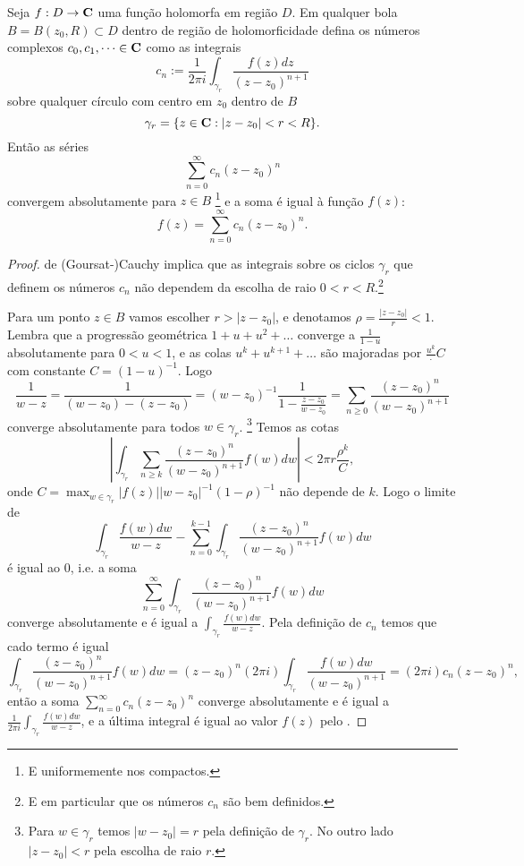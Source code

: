 \begin{teorema}
\label{t:hol-series}
Seja $f : D \to \mathbf{C}$ uma função holomorfa em região $D$.
Em qualquer bola $B = B(z_0,R) \subset D$ dentro de região de holomorficidade
defina os números complexos $c_0,c_1,\dots\in\mathbf{C}$ como as integrais
\begin{equation}
 c_n := \frac1{2\pi i} \int_{\gamma_r} \frac{f(z)dz}{(z-z_0)^{n+1}} 
\end{equation}
sobre qualquer círculo com centro em $z_0$ dentro de $B$  
\[ \gamma_r = \{ z\in \mathbf{C} : |z-z_0|< r < R \}. \]
Então as séries
\[ \sum_{n=0}^\infty c_n (z-z_0)^n \]
convergem absolutamente para $z\in B$
\footnote{E uniformemente nos compactos.}
e a soma é igual à função $f(z)$:
\[ f(z) = \sum_{n=0}^\infty c_n (z-z_0)^n. \]
\end{teorema}
\begin{proof}
 de (Goursat-)Cauchy implica que as integrais sobre os ciclos $\gamma_r$
que definem os números $c_n$
não dependem da escolha de raio $0<r<R$.\footnote{E em particular que os números $c_n$ são bem definidos.}

Para um ponto $z\in B$ vamos escolher $r > |z-z_0|$, e denotamos $\rho = \frac{|z-z_0|}{r} < 1$.
Lembra que a progressão geométrica $1 + u + u^2 + \dots$ converge a $\frac{1}{1-u}$ absolutamente para $0<u<1$,
e as colas $u^k + u^{k+1} + \dots$ são majoradas por $\frac{u^k} \cdot C$ com constante $C = (1-u)^{-1}$.
Logo 
\begin{equation*}
 \frac{1}{w-z} = \frac{1}{(w-z_0)-(z-z_0)} = (w-z_0)^{-1} \frac1{1-\frac{z-z_0}{w-z_0}}
= \sum_{n\geq 0} \frac{(z-z_0)^n}{(w-z_0)^{n+1}}
\end{equation*}
converge absolutamente para todos $w\in\gamma_r$.
\footnote{Para $w\in \gamma_r$ temos $|w-z_0| = r$ pela definição de $\gamma_r$.
No outro lado $|z-z_0|<r$ pela escolha de raio $r$.}
Temos as cotas
\[ |\int_{\gamma_r} \sum_{n\geq k} \frac{(z-z_0)^n}{(w-z_0)^{n+1}} f(w) dw|
< 2\pi r \frac{\rho^k} C, \]
onde $C = \max_{w\in\gamma_r} |f(z)| |w-z_0|^{-1} (1-\rho)^{-1}$ não depende de $k$.
Logo o limite de
\[ \int_{\gamma_r} \frac{f(w)dw}{w-z} - \sum_{n=0}^{k-1} \int_{\gamma_r} \frac{(z-z_0)^n}{(w-z_0)^{n+1}} f(w) dw \]
é igual ao $0$, i.e. a soma
\[ \sum_{n=0}^\infty \int_{\gamma_r} \frac{(z-z_0)^n}{(w-z_0)^{n+1}} f(w) dw \]
converge absolutamente e é igual a $\int_{\gamma_r} \frac{f(w)dw}{w-z}$.
Pela definição de $c_n$ temos que cado termo é igual
\[ \int_{\gamma_r} \frac{(z-z_0)^n}{(w-z_0)^{n+1}} f(w) dw 
= (z-z_0)^n (2\pi i) \int_{\gamma_r} \frac{f(w)dw}{(w-z_0)^{n+1}}
= (2\pi i) c_n (z-z_0)^n, \]
então a soma $\sum_{n=0}^\infty c_n (z-z_0)^n$ converge absolutamente
e é igual a $\frac{1}{2\pi i} \int_{\gamma_r} \frac{f(w)dw}{w-z}$,
e a última integral é igual ao valor $f(z)$ pelo .
\end{proof}

